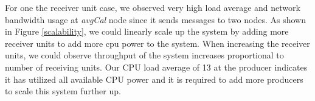 For one the receiver unit case, we observed very high load average and network bandwidth usage at \textit{avgCal} node since it sends messages to two nodes. As shown in  Figure \ref{scalability}, we could linearly scale up the system by adding more receiver units to add more cpu power to the system. When increasing the receiver units, we could observe throughput of the system increases proportional to number of receiving units. Our CPU load average of 13 at the producer indicates it has utilized all available CPU power and it is required to add more producers to scale this system further up. 


